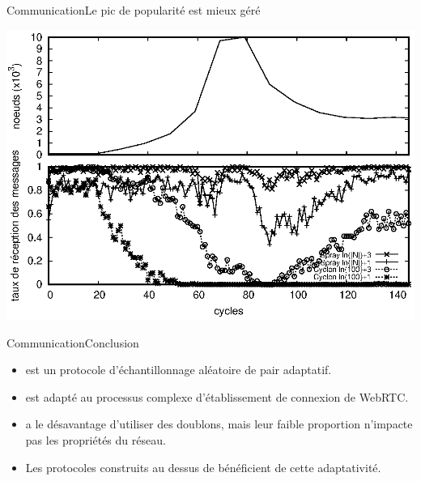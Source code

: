 \begin{frame}{Communication}{Le pic de popularité est mieux géré}
  \begin{center}
    \includegraphics[width=1\textwidth]{img/network/peak.eps}
  \end{center} 
\end{frame}



\begin{frame}{Communication}{Conclusion}
  
  \begin{itemize}
  \item \SPRAY est un protocole d'échantillonnage aléatoire de pair adaptatif.
  \item \SPRAY est adapté au processus complexe d'établissement de connexion de
    WebRTC.
  \end{itemize}

  \vspace{0.25cm}

  \begin{itemize}
  \item \SPRAY a le désavantage d'utiliser des doublons, mais leur faible
    proportion n'impacte pas les propriétés du réseau.    
  \end{itemize}

  \vspace{0.25cm}

  \begin{itemize}
  \item Les protocoles construits au dessus de \SPRAY bénéficient de cette
    adaptativité.
  \end{itemize}

\end{frame}